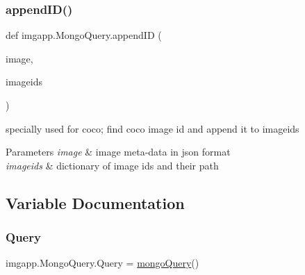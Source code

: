 \subsubsection{\texorpdfstring{append\+I\+D()}{appendID()}}
{\footnotesize\ttfamily def imgapp.\+Mongo\+Query.\+append\+ID (\begin{DoxyParamCaption}\item[{}]{image,  }\item[{}]{imageids }\end{DoxyParamCaption})}



specially used for coco; find coco image id and append it to imageids 


\begin{DoxyParams}{Parameters}
{\em image} & image meta-\/data in json format \\
\hline
{\em imageids} & dictionary of image ids and their path \\
\hline
\end{DoxyParams}


\subsection{Variable Documentation}
\mbox{\label{namespaceimgapp_1_1MongoQuery_a3c845d9e355454c43db2eca20b9058bb}} 
\subsubsection{\texorpdfstring{Query}{Query}}
{\footnotesize\ttfamily imgapp.\+Mongo\+Query.\+Query = \hyperlink{classimgapp_1_1MongoQuery_1_1mongoQuery}{mongo\+Query}()}


